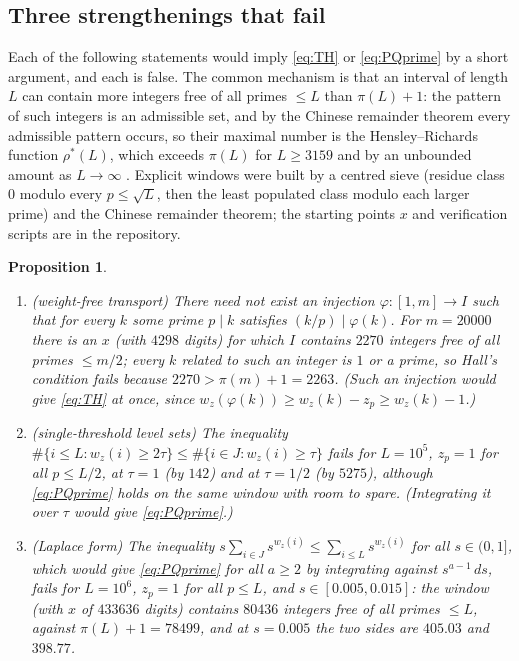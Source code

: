 \documentclass[11pt]{article}
\newtheorem{proposition}[theorem]{Proposition}
\theoremstyle{definition}
\begin{document}
\subsection*{Three strengthenings that fail}
Each of the following statements would imply \eqref{eq:TH} or \eqref{eq:PQprime} by a short argument, and each is
false. The common mechanism is that an interval of length $L$ can contain more integers free of all primes $\le L$
than $\pi(L)+1$: the pattern of such integers is an admissible set, and by the Chinese remainder theorem every
admissible pattern occurs, so their maximal number is the Hensley--Richards function $\rho^*(L)$, which exceeds
$\pi(L)$ for $L\ge3159$ and by an unbounded amount as $L\to\infty$ \cite{HR74,GR98}. Explicit windows were built
by a centred sieve (residue class $0$ modulo every $p\le\sqrt L$, then the least populated class modulo each larger
prime) and the Chinese remainder theorem; the starting points $x$ and verification scripts are in the repository.

\begin{proposition}\label{prop:false}
\begin{enumerate}
\item[(a)] \emph{(weight-free transport)} There need not exist an injection $\varphi:[1,m]\to I$ such that for every
$k$ some prime $p\mid k$ satisfies $(k/p)\mid\varphi(k)$. For $m=20000$ there is an $x$ (with $4298$ digits) for which
$I$ contains $2270$ integers free of all primes $\le m/2$; every $k$ related to such an integer is $1$ or a prime, so
Hall's condition fails because $2270>\pi(m)+1=2263$. (Such an injection would give \eqref{eq:TH} at once, since
$w_z(\varphi(k))\ge w_z(k)-z_p\ge w_z(k)-1$.)
\item[(b)] \emph{(single-threshold level sets)} The inequality $\#\{i\le L:w_z(i)\ge2\tau\}\le\#\{i\in J:w_z(i)\ge\tau\}$
fails for $L=10^5$, $z_p=1$ for all $p\le L/2$, at $\tau=1$ (by $142$) and at $\tau=1/2$ (by $5275$), although
\eqref{eq:PQprime} holds on the same window with room to spare. (Integrating it over $\tau$ would give
\eqref{eq:PQprime}.)
\item[(c)] \emph{(Laplace form)} The inequality $s\sum_{i\in J}s^{w_z(i)}\le\sum_{i\le L}s^{w_z(i)}$ for all
$s\in(0,1]$, which would give \eqref{eq:PQprime} for all $a\ge2$ by integrating against $s^{a-1}\,ds$, fails for
$L=10^6$, $z_p=1$ for all $p\le L$, and $s\in[0.005,0.015]$: the window (with $x$ of $433636$ digits) contains
$80436$ integers free of all primes $\le L$, against $\pi(L)+1=78499$, and at $s=0.005$ the two sides are
$405.03$ and $398.77$.
\end{enumerate}
\end{proposition}
\end{document}
